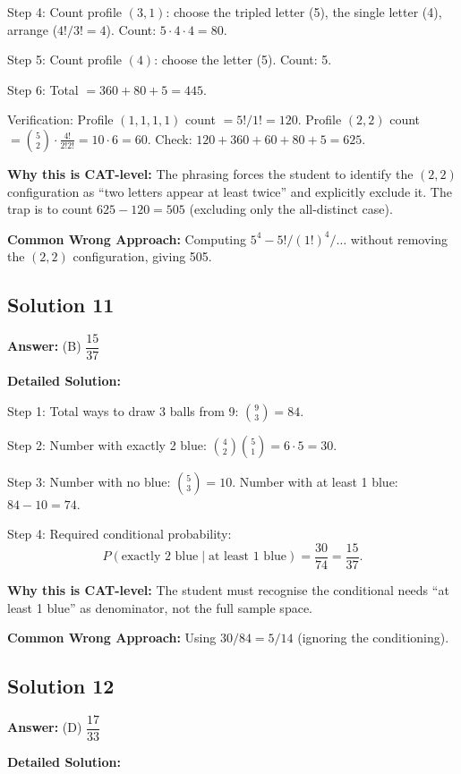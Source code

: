 \documentclass[11pt]{article}
\begin{document}
Step 4: Count profile \( (3,1) \): choose the tripled letter (5), the single letter (4), arrange (\( 4!/3! = 4 \)). Count: \( 5 \cdot 4 \cdot 4 = 80 \).

Step 5: Count profile \( (4) \): choose the letter (5). Count: 5.

Step 6: Total \( = 360 + 80 + 5 = 445 \).

Verification: Profile \( (1,1,1,1) \) count \( = 5! / 1! = 120 \). Profile \( (2,2) \) count \( = \binom{5}{2} \cdot \frac{4!}{2!2!} = 10 \cdot 6 = 60 \). Check: \( 120 + 360 + 60 + 80 + 5 = 625 \). \checkmark

\textbf{Why this is CAT-level:} The phrasing forces the student to identify the \( (2,2) \) configuration as ``two letters appear at least twice'' and explicitly exclude it. The trap is to count \( 625 - 120 = 505 \) (excluding only the all-distinct case).

\textbf{Common Wrong Approach:} Computing \( 5^4 - 5! /(1!)^4 / \ldots \) without removing the \( (2,2) \) configuration, giving 505.

\subsection*{Solution 11}
\textbf{Answer:} (B) \( \dfrac{15}{37} \)

\textbf{Detailed Solution:}

Step 1: Total ways to draw 3 balls from 9: \( \binom{9}{3} = 84 \).

Step 2: Number with exactly 2 blue: \( \binom{4}{2}\binom{5}{1} = 6 \cdot 5 = 30 \).

Step 3: Number with no blue: \( \binom{5}{3} = 10 \). Number with at least 1 blue: \( 84 - 10 = 74 \).

Step 4: Required conditional probability:
\[
P(\text{exactly 2 blue} \mid \text{at least 1 blue}) = \frac{30}{74} = \frac{15}{37}.
\]

\textbf{Why this is CAT-level:} The student must recognise the conditional needs ``at least 1 blue'' as denominator, not the full sample space.

\textbf{Common Wrong Approach:} Using \( 30/84 = 5/14 \) (ignoring the conditioning).

\subsection*{Solution 12}
\textbf{Answer:} (D) \( \dfrac{17}{33} \)

\textbf{Detailed Solution:}
\end{document}
